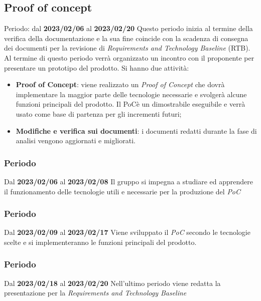 \subsection{Proof of concept}
Periodo: dal \textbf{2023/02/06} al \textbf{2023/02/20} \newline
Questo periodo inizia al termine della verifica della documentazione e la sua fine coincide con la scadenza
di consegna dei documenti per la revisione di \textit{Requirements and Technology Baseline\glo} (RTB\glo).
Al termine di questo periodo verrà organizzato un incontro con il proponente per presentare un prototipo del prodotto.\newline
Si hanno due attività:
\begin{itemize}
        \item \textbf{Proof of Concept}: viene realizzato un \textit{Proof of Concept} che dovrà implementare la maggior 
        parte delle tecnologie necessarie e svolgerà alcune funzioni principali del prodotto. Il PoC\glo è un dimostrabile eseguibile
        e verrà usato come base di partenza per gli incrementi futuri;
        \item \textbf{Modifiche e verifica sui documenti}: i documenti redatti durante la fase di analisi vengono aggiornati e migliorati.
\end{itemize}
\subsubsection{ Periodo}
Dal \textbf{2023/02/06} al \textbf{2023/02/08}
\newline
Il gruppo si impegna a studiare ed apprendere il funzionamento delle tecnologie utili e necessarie per la produzione del \textit{PoC}

\subsubsection{ Periodo}
Dal \textbf{2023/02/09} al \textbf{2023/02/17}
\newline
Viene sviluppato il \textit{PoC} secondo le tecnologie scelte e si implementeranno le funzioni principali del prodotto.

\subsubsection{ Periodo}
Dal \textbf{2023/02/18} al \textbf{2023/02/20}
\newline
Nell'ultimo periodo viene redatta la presentazione per la \textit{Requirements and Technology Baseline}

